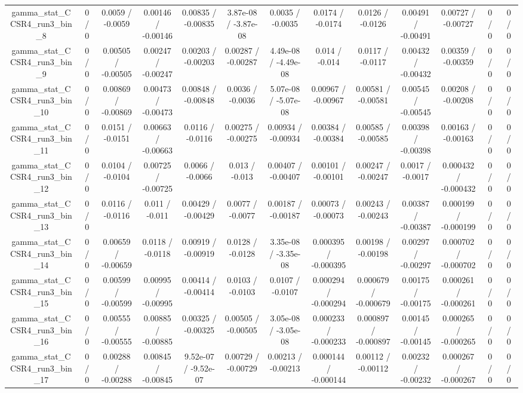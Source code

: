 \documentclass[10pt]{article}
\begin{document}
\begin{table}[htbp]
\begin{center}
\begin{tabular}{|c|c|c|c|c|c|c|c|c|c|c|c|c|}
  gamma_stat_CCSR4_run3_bin_8 & 0 / 0 & 0.0059 / -0.0059 & 0.00146 / -0.00146 & 0.00835 / -0.00835 & 3.87e-08 / -3.87e-08 & 0.0035 / -0.0035 & 0.0174 / -0.0174 & 0.0126 / -0.0126 & 0.00491 / -0.00491 & 0.00727 / -0.00727 & 0 / 0 & 0 / 0 \\ 
  gamma_stat_CCSR4_run3_bin_9 & 0 / 0 & 0.00505 / -0.00505 & 0.00247 / -0.00247 & 0.00203 / -0.00203 & 0.00287 / -0.00287 & 4.49e-08 / -4.49e-08 & 0.014 / -0.014 & 0.0117 / -0.0117 & 0.00432 / -0.00432 & 0.00359 / -0.00359 & 0 / 0 & 0 / 0 \\ 
  gamma_stat_CCSR4_run3_bin_10 & 0 / 0 & 0.00869 / -0.00869 & 0.00473 / -0.00473 & 0.00848 / -0.00848 & 0.0036 / -0.0036 & 5.07e-08 / -5.07e-08 & 0.00967 / -0.00967 & 0.00581 / -0.00581 & 0.00545 / -0.00545 & 0.00208 / -0.00208 & 0 / 0 & 0 / 0 \\ 
  gamma_stat_CCSR4_run3_bin_11 & 0 / 0 & 0.0151 / -0.0151 & 0.00663 / -0.00663 & 0.0116 / -0.0116 & 0.00275 / -0.00275 & 0.00934 / -0.00934 & 0.00384 / -0.00384 & 0.00585 / -0.00585 & 0.00398 / -0.00398 & 0.00163 / -0.00163 & 0 / 0 & 0 / 0 \\ 
  gamma_stat_CCSR4_run3_bin_12 & 0 / 0 & 0.0104 / -0.0104 & 0.00725 / -0.00725 & 0.0066 / -0.0066 & 0.013 / -0.013 & 0.00407 / -0.00407 & 0.00101 / -0.00101 & 0.00247 / -0.00247 & 0.0017 / -0.0017 & 0.000432 / -0.000432 & 0 / 0 & 0 / 0 \\ 
  gamma_stat_CCSR4_run3_bin_13 & 0 / 0 & 0.0116 / -0.0116 & 0.011 / -0.011 & 0.00429 / -0.00429 & 0.0077 / -0.0077 & 0.00187 / -0.00187 & 0.00073 / -0.00073 & 0.00243 / -0.00243 & 0.00387 / -0.00387 & 0.000199 / -0.000199 & 0 / 0 & 0 / 0 \\ 
  gamma_stat_CCSR4_run3_bin_14 & 0 / 0 & 0.00659 / -0.00659 & 0.0118 / -0.0118 & 0.00919 / -0.00919 & 0.0128 / -0.0128 & 3.35e-08 / -3.35e-08 & 0.000395 / -0.000395 & 0.00198 / -0.00198 & 0.00297 / -0.00297 & 0.000702 / -0.000702 & 0 / 0 & 0 / 0 \\ 
  gamma_stat_CCSR4_run3_bin_15 & 0 / 0 & 0.00599 / -0.00599 & 0.00995 / -0.00995 & 0.00414 / -0.00414 & 0.0103 / -0.0103 & 0.0107 / -0.0107 & 0.000294 / -0.000294 & 0.000679 / -0.000679 & 0.00175 / -0.00175 & 0.000261 / -0.000261 & 0 / 0 & 0 / 0 \\ 
  gamma_stat_CCSR4_run3_bin_16 & 0 / 0 & 0.00555 / -0.00555 & 0.00885 / -0.00885 & 0.00325 / -0.00325 & 0.00505 / -0.00505 & 3.05e-08 / -3.05e-08 & 0.000233 / -0.000233 & 0.000897 / -0.000897 & 0.00145 / -0.00145 & 0.000265 / -0.000265 & 0 / 0 & 0 / 0 \\ 
  gamma_stat_CCSR4_run3_bin_17 & 0 / 0 & 0.00288 / -0.00288 & 0.00845 / -0.00845 & 9.52e-07 / -9.52e-07 & 0.00729 / -0.00729 & 0.00213 / -0.00213 & 0.000144 / -0.000144 & 0.00112 / -0.00112 & 0.00232 / -0.00232 & 0.000267 / -0.000267 & 0 / 0 & 0 / 0 \\ 

\end{tabular}
\end{center}
\end{table}
\end{document}
